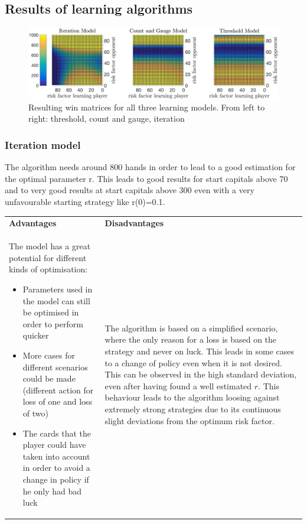 \documentclass[11pt]{article}
\begin{document}
\subsection{Results of learning algorithms}

\begin{center}
\begin{figure}

\includegraphics[scale=.23]{Graphics/OvViewLatex18}
\caption{Resulting win matrices for all three learning models. From left to right: threshold, count and gauge, iteration}
\label{LearningModelsAllDataOverview}

\end{figure}
\end{center}


\subsubsection{Iteration model}

The algorithm needs around 800 hands in order to lead to a good estimation for the optimal parameter r. This leads to good results for start capitals above 70 and to very good results at start capitals above 300 even with a very unfavourable starting strategy like r(0)=0.1.
\\

\begin{tabular}{ p{7.2cm}  p{7.2cm}}
\textbf{Advantages} & \textbf{Disadvantages}\\
The model has a great potential for different kinds of optimisation:
\begin{itemize}
\item Parameters used in the model can still be optimised in order to perform quicker
\item More cases for different scenarios could be made (different action for loss of one and loss of two)
\item The cards that the player could have taken into account in order to avoid a change in policy if he only had bad luck
\end{itemize}
& The algorithm is based on a simplified scenario, where the only reason for a loss is based on the strategy and never on luck. This leads in some cases to a change of policy even when it is not desired. This can be observed in the high standard deviation, even after having found a well estimated $r$. This behaviour leads to the algorithm loosing against extremely strong strategies due to its continuous slight deviations from the optimum risk factor.\\ 
\end{tabular}
\end{document}
